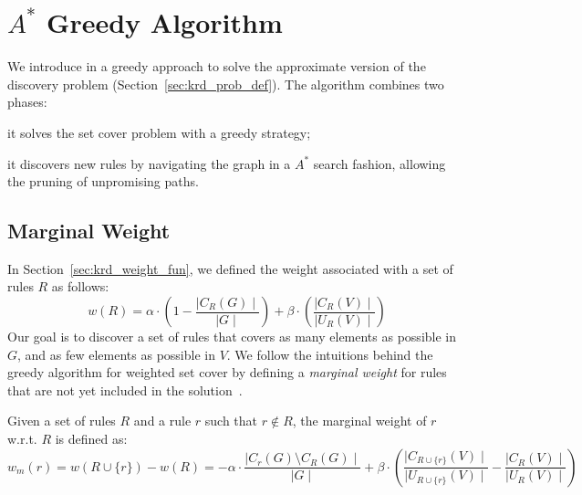 \section{$A^*$ Greedy Algorithm} \label{sec:krd_greedy}
We introduce in \krd a greedy approach to solve the approximate version of the discovery problem (Section~\ref{sec:krd_prob_def}). The algorithm combines two phases:
\begin{inparaenum}[\itshape(i)]
	\item it solves the set cover problem with a greedy strategy;
	\item it discovers new rules by navigating the graph in a $A^*$ search fashion, allowing the pruning of unpromising paths.	
\end{inparaenum}

\subsection{Marginal Weight}
In Section~\ref{sec:krd_weight_fun}, we defined the weight associated with a set of rules $R$ as follows:
\begin{equation*}
w(R) = \alpha \cdot (1-\frac{\mid C_{R}(G)\mid}{\mid G \mid}) +\beta \cdot (\frac{\mid C_{R}(V) \mid}{\mid U_{R}(V)\mid})
\end{equation*}
Our goal is to discover a set of rules that covers as many elements as possible in $G$, and as few elements as possible in $V$. We follow the intuitions behind the greedy algorithm for weighted set cover by defining a \emph{marginal weight} for rules that are not yet included in the solution~\cite{chvatal1979greedy}.

\begin{definition}
	Given a set of rules $R$ and a rule $r$ such that $r \notin R$, the marginal weight of $r$ w.r.t. $R$ is defined as:
	\begin{equation*}
	w_m(r) = w(R \cup \{r\}) - w(R) = - \alpha \cdot \frac{\mid C_{r}(G) \setminus C_{R}(G) \mid}{\mid G \mid} + \beta \cdot (\frac{\mid C_{R \cup \{r\}}(V) \mid}{\mid U_{R \cup \{r\}}(V) \mid} - \frac{\mid C_{R}(V) \mid}{\mid U_{R}(V) \mid})
	\end{equation*}
\end{definition}



